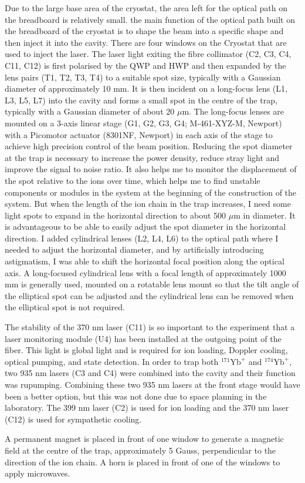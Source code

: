 Due to the large base area of the cryostat, the area left for the optical path on the breadboard is relatively small. the main function of the optical path built on the breadboard of the cryostat is to shape the beam into a specific shape and then inject it into the cavity. There are four windows on the Cryostat that are used to inject the laser. The laser light exiting the fibre collimator (C2, C3, C4, C11, C12) is first polarised by the QWP and HWP and then expanded by the lens pairs (T1, T2, T3, T4) to a suitable spot size, typically with a Gaussian diameter of approximately 10 mm. It is then incident on a long-focus lens (L1, L3, L5, L7) into the cavity and forms a small spot in the centre of the trap, typically with a Gaussian diameter of about 20 $\mu$m. The long-focus lenses are mounted on a 3-axis linear stage (G1, G2, G3, G4; M-461-XYZ-M, Newport) with a Picomotor actuator (8301NF, Newport) in each axis of the stage to achieve high precision control of the beam position. Reducing the spot diameter at the trap is necessary to increase the power density, reduce stray light and improve the signal to noise ratio. It also helps me to monitor the displacement of the spot relative to the ions over time, which helps me to find unstable components or modules in the system at the beginning of the construction of the system. But when the length of the ion chain in the trap increases, I need some light spots to expand in the horizontal direction to about 500 $\mu$m in diameter. It is advantageous to be able to easily adjust the spot diameter in the horizontal direction. I added cylindrical lenses (L2, L4, L6) to the optical path where I needed to adjust the horizontal diameter, and by artificially introducing astigmatism, I was able to shift the horizontal focal position along the optical axis. A long-focused cylindrical lens with a focal length of approximately 1000 mm is generally used, mounted on a rotatable lens mount so that the tilt angle of the elliptical spot can be adjusted and the cylindrical lens can be removed when the elliptical spot is not required.

The stability of the 370 nm laser (C11) is so important to the experiment that a laser monitoring module (U4) has been installed at the outgoing point of the fiber. This light is global light and is required for ion loading, Doppler cooling, optical pumping, and state detection. In order to trap both ${ }^{171} \mathrm{Yb}^{+}$ and ${ }^{174} \mathrm{Yb}^{+}$, two 935 nm lasers (C3 and C4) were combined into the cavity and their function was rupumping. Combining these two 935 nm lasers at the front stage would have been a better option, but this was not done due to space planning in the laboratory. The 399 nm laser (C2) is used for ion loading and the 370 nm laser (C12) is used for sympathetic cooling.

A permanent magnet is placed in front of one window to generate a magnetic field at the centre of the trap, approximately 5 Gauss, perpendicular to the direction of the ion chain. A horn is placed in front of one of the windows to apply microwaves.
